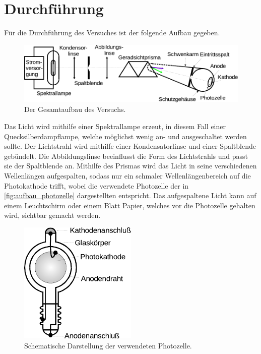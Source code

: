 \section{Durchführung}
\label{sec:durchfuehrung}

    Für die Durchführung des Versuches ist der folgende Aufbau gegeben.

    \begin{figure}
        \centering
        \includegraphics[width=\textwidth]{content/img/Abb_3.pdf}
        \caption{Der Gesamtaufbau des Versuchs. \cite{versuchsanleitung}}
        \label{fig:gesamtaufbau}
    \end{figure}

    Das Licht wird mithilfe einer Spektrallampe erzeut,
    in diesem Fall einer Quecksilberdampflampe,
    welche möglichst wenig an- und ausgeschaltet werden sollte.
    Der Lichtstrahl wird mithilfe einer Kondensatorlinse und einer Spaltblende gebündelt.
    Die Abbildungslinse beeinflusst die Form des Lichtstrahls und passt sie der Spaltblende an.
    Mithilfe des Prismas wird das Licht in seine verschiedenen Wellenlängen aufgespalten,
    sodass nur ein schmaler Wellenlängenbereich auf die Photokathode trifft,
    wobei die verwendete Photozelle der in \autoref{fig:aufbau_photozelle} dargestellten entspricht.
    Das aufgespaltene Licht kann auf einem Leuchtschirm oder einem Blatt Papier,
    welches vor die Photozelle gehalten wird,
    sichtbar gemacht werden.\\

    \begin{figure}[H]
        \centering
        \includegraphics[width=0.5\textwidth]{content/img/Abb_2_edit.pdf}
        \caption{Schematische Darstellung der verwendeten Photozelle. \cite{versuchsanleitung}}
        \label{fig:aufbau_photozelle}
    \end{figure}

